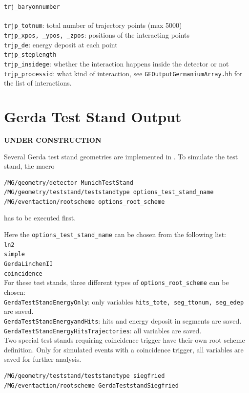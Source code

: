\nolinkurl{trj_baryonnumber}\\
\\
\nolinkurl{trjp_totnum}: total number of trajectory points (max 5000) \\
\nolinkurl{trjp_xpos, _ypos, _zpos}: positions of the interacting points\\
\nolinkurl{trjp_de}: energy deposit at each point\\
\nolinkurl{trjp_steplength}\\
\nolinkurl{trjp_insidege}: whether the interaction happens inside the detector or not\\
\nolinkurl{trjp_processid}: what kind of interaction, see 
\nolinkurl{GEOutputGermaniumArray.hh} for the list of interactions.\\


\section{Gerda Test Stand Output} 

{\bf UNDER CONSTRUCTION}

Several Gerda test stand geometries are implemented in \mage.
To simulate the test stand, the macro
\begin{lstlisting}
/MG/geometry/detector MunichTestStand
/MG/geometry/teststand/teststandtype options_test_stand_name
/MG/eventaction/rootscheme options_root_scheme
\end{lstlisting}
has to be executed first.


Here the \nolinkurl{options_test_stand_name} can be chosen from
the following list:\\
\nolinkurl{ln2}\\
\nolinkurl{simple}\\
\nolinkurl{GerdaLinchenII}\\
\nolinkurl{coincidence}\\

For these test stands, three different types of 
\nolinkurl{options_root_scheme}
can be chosen:\\
\nolinkurl{GerdaTestStandEnergyOnly}: only variables
\nolinkurl{hits_tote, seg_ttonum, seg_edep} are saved.\\
\nolinkurl{GerdaTestStandEnergyandHits}: hits and energy deposit in segments
are saved.\\
\nolinkurl{GerdaTestStandEnergyHitsTrajectories}:
all variables are saved.\\


Two special test stands requiring coincidence trigger
have their own root scheme definition.
Only for simulated events with a coincidence trigger,
all variables are saved for further analysis.
\begin{lstlisting}
/MG/geometry/teststand/teststandtype siegfried
/MG/eventaction/rootscheme GerdaTeststandSiegfried
\end{lstlisting}

